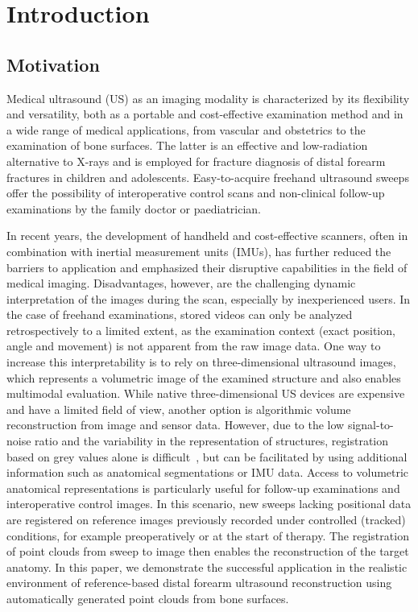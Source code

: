  

\section{Introduction}\label{sec1}

\subsection{Motivation}
Medical ultrasound (US) as an imaging modality is characterized by its flexibility and versatility, both as a portable and cost-effective examination method and in a wide range of medical applications, from vascular and obstetrics to the examination of bone surfaces. The latter is an effective and low-radiation alternative to X-rays and is employed for fracture diagnosis of distal forearm fractures in children and adolescents. Easy-to-acquire freehand ultrasound sweeps offer the possibility of interoperative control scans and non-clinical follow-up examinations by the family doctor or paediatrician. 

In recent years, the development of handheld and cost-effective scanners, often in combination with inertial measurement units (IMUs), has further reduced the barriers to application and emphasized their disruptive capabilities in the field of medical imaging.  
Disadvantages, however, are the challenging dynamic interpretation of the images during the scan, especially by inexperienced users. In the case of freehand examinations, stored videos can only be analyzed retrospectively to a limited extent, as the examination context (exact position, angle and movement) is not apparent from the raw image data. One way to increase this interpretability is to rely on three-dimensional ultrasound images, which represents a volumetric image of the examined structure and also enables multimodal evaluation. While native three-dimensional US devices are expensive and have a limited field of view, another option is algorithmic volume reconstruction from image and sensor data. However, due to the low signal-to-noise ratio and the variability in the representation of structures, registration based on grey values alone is difficult~\citep{che2017ultrasound}, but can be facilitated by using additional information such as anatomical segmentations or IMU data. Access to volumetric anatomical representations is particularly useful for follow-up examinations and interoperative control images. In this scenario, new sweeps lacking positional data are registered on reference images previously recorded under controlled (tracked) conditions, for example preoperatively or at the start of therapy. The registration of point clouds from sweep to image then enables the reconstruction of the target anatomy. In this paper, we demonstrate the successful application in the realistic environment of reference-based distal forearm ultrasound reconstruction using automatically generated point clouds from bone surfaces.


